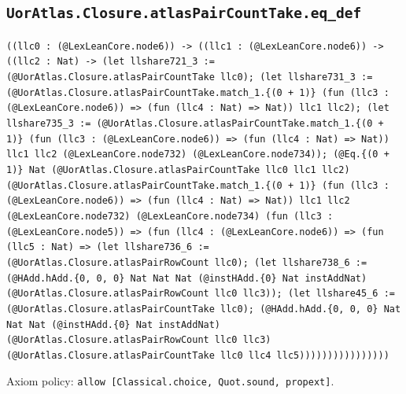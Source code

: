 \documentclass[11pt]{article}
\begin{document}
\subsection*{\texttt{UorAtlas.Closure.atlasPairCountTake.eq\_def}}
\noindent\texttt{((llc0 : (@LexLeanCore.node6)) -> ((llc1 : (@LexLeanCore.node6)) -> ((llc2 : Nat) -> (let llshare721\_3 := (@UorAtlas.Closure.atlasPairCountTake llc0); (let llshare731\_3 := (@UorAtlas.Closure.atlasPairCountTake.match\_1.\{(0 + 1)\} (fun (llc3 : (@LexLeanCore.node6)) => (fun (llc4 : Nat) => Nat)) llc1 llc2); (let llshare735\_3 := (@UorAtlas.Closure.atlasPairCountTake.match\_1.\{(0 + 1)\} (fun (llc3 : (@LexLeanCore.node6)) => (fun (llc4 : Nat) => Nat)) llc1 llc2 (@LexLeanCore.node732) (@LexLeanCore.node734)); (@Eq.\{(0 + 1)\} Nat (@UorAtlas.Closure.atlasPairCountTake llc0 llc1 llc2) (@UorAtlas.Closure.atlasPairCountTake.match\_1.\{(0 + 1)\} (fun (llc3 : (@LexLeanCore.node6)) => (fun (llc4 : Nat) => Nat)) llc1 llc2 (@LexLeanCore.node732) (@LexLeanCore.node734) (fun (llc3 : (@LexLeanCore.node5)) => (fun (llc4 : (@LexLeanCore.node6)) => (fun (llc5 : Nat) => (let llshare736\_6 := (@UorAtlas.Closure.atlasPairRowCount llc0); (let llshare738\_6 := (@HAdd.hAdd.\{0, 0, 0\} Nat Nat Nat (@instHAdd.\{0\} Nat instAddNat) (@UorAtlas.Closure.atlasPairRowCount llc0 llc3)); (let llshare45\_6 := (@UorAtlas.Closure.atlasPairCountTake llc0); (@HAdd.hAdd.\{0, 0, 0\} Nat Nat Nat (@instHAdd.\{0\} Nat instAddNat) (@UorAtlas.Closure.atlasPairRowCount llc0 llc3) (@UorAtlas.Closure.atlasPairCountTake llc0 llc4 llc5))))))))))))))))}\par
\noindent Axiom policy: \texttt{allow [Classical.choice, Quot.sound, propext]}.\par
\end{document}
